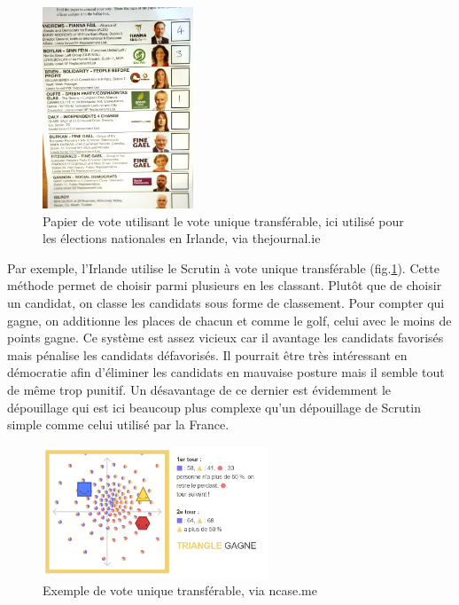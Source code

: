 \documentclass[11pt,a4paper]{report}
\begin{document}
\begin{figure}[h]
	\centering
	\includegraphics[width=0.4\textwidth]{./images/transfer.png}
	\caption{Papier de vote utilisant le vote unique transférable, ici utilisé pour les élections nationales en Irlande, via thejournal.ie \cite{thejournal:ireland}}
	\label{sim:transfer-ex}
\end{figure}

Par exemple, l'Irlande utilise le Scrutin à vote unique transférable (fig.\ref{sim:transfer-ex}).
Cette méthode permet de choisir parmi plusieurs en les classant. Plutôt que de choisir un candidat, on classe les candidats sous forme de classement.
Pour compter qui gagne, on additionne les places de chacun et comme le golf, celui avec le moins de points gagne.
Ce système est assez vicieux car il avantage les candidats favorisés mais pénalise les candidats défavorisés.
Il pourrait être très intéressant en démocratie afin d'éliminer les candidats en mauvaise posture mais il semble tout de même trop punitif.
Un désavantage de ce dernier est évidemment le dépouillage qui est ici beaucoup plus complexe qu’un dépouillage de Scrutin simple comme celui utilisé par la France.

\begin{figure}[h]
	\centering
	\includegraphics[width=0.6\textwidth]{./images/vote-unique-tranferable.png}
	\caption{Exemple de vote unique transférable, via ncase.me \cite{ncase:ballot}}
	\label{sim:transfer}
\end{figure}
\end{document}
